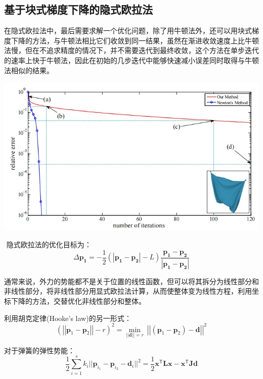 \documentclass{CLGPY}
\begin{document}
\begin{multicols}{2}
		\section{基于块式梯度下降的隐式欧拉法\textsuperscript{\cite{1}}}
		在隐式欧拉法中，最后需要求解一个优化问题，除了用牛顿法外，还可以用块式梯度下降的方法，与牛顿法相比它们收敛到同一结果，虽然在渐进收敛速度上比牛顿法慢，但在不追求精度的情况下，并不需要迭代到最终收敛，这个方法在单步迭代的速率上快于牛顿法，因此在初始的几步迭代中能够快速减小误差同时取得与牛顿法相似的结果。

        \begin{center}
            \includegraphics[width=1.0\linewidth]{./fig/块式梯度下降与牛顿法.jpg}
        \end{center}


​		隐式欧拉法的优化目标为：
       \begin{equation}
		\Delta \pmb{p_1} =-\frac{1}{2}(\left | \pmb{p_1}-\pmb{p_2} \right |-L)\frac{\pmb{p_1}-\pmb{p_2}}{\left | \pmb{p_1}-\pmb{p_2} \right |}
		\end{equation}

		通常来说，外力的势能都不是关于位置的线性函数，但可以将其拆分为线性部分和非线性部分，将非线性部分用显式欧拉法计算，从而使整体变为线性方程，利用坐标下降的方法，交替优化非线性部分和整体。
	
		利用胡克定律(Hooke's law)的另一形式：
       \begin{equation}
			\left(\left|\left|\mathbf{p}_{1}-\mathbf{p}_{2}\right|\right|-r\right)^{2}=\operatorname*{min}_{\left|\left|\mathbf{d}\right|\right|=r}\ \left|\left|\left(\mathbf{p}_{1}-\mathbf{p}_{2}\right)-\mathbf{d}\right|\right|^{2}
		\end{equation}
	
		对于弹簧的弹性势能：
       \begin{equation}
			\frac{1}{2}\sum_{i=1}^{s}k_{i}||\mathbf{p}_{i_{1}}-\mathbf{p}_{i_{2}}-\mathbf{d}_{i}||^{2}={\frac{1}{2}}\mathbf{x}^{\mathsf{T}}\mathbf{L}\mathbf{x}-\mathbf{x}^{\mathsf{T}}\mathbf{J}\mathbf{d}
		\end{equation}


\end{multicols}
\end{document}
